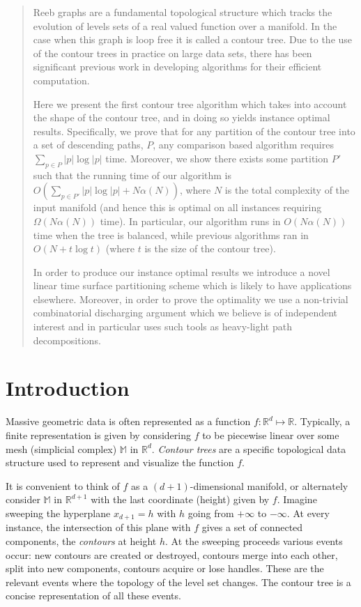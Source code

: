\documentclass[11pt]{article}
\theoremstyle{definition}
\newcommand{\MM}{\mathbb{M}}
\newcommand{\RR}{\mathbb{R}}
\begin{document}
\begin{abstract}
{Reeb graphs are a fundamental topological structure which tracks the evolution of levels sets of a real valued function over a manifold.  
In the case when this graph is loop free it is called a contour tree.  Due to the use of the contour trees in practice on large data sets, 
there has been significant previous work in developing algorithms for their efficient computation. 

Here we present the first contour tree algorithm which takes into account the shape of the contour tree, 
and in doing so yields instance optimal results.
Specifically, we prove that for any partition of the contour tree into a set of descending paths, $P$, 
any comparison based algorithm requires $\sum_{p\in P} |p|\log|p|$ time.  Moreover, we show there   
exists some partition $P'$ such that the running time of our algorithm is 
$O(\sum_{p\in P'} |p|\log|p| + N\alpha(N))$, where $N$ is the total complexity of the input manifold 
(and hence this is optimal on all instances requiring $\Omega(N\alpha(N))$ time).
In particular, our algorithm runs in $O(N\alpha(N))$ time when the tree is balanced, 
while previous algorithms ran in $O(N+t\log t)$ (where $t$ is the size of the contour tree).

In order to produce our instance optimal results we introduce a novel linear time surface partitioning scheme which is likely to have applications elsewhere.
Moreover, in order to prove the optimality we use a non-trivial combinatorial discharging argument which we believe is of independent interest and in particular uses 
such tools as heavy-light path decompositions.
}
\end{abstract}


\section{Introduction}

Massive geometric data is often represented as a function $f: \RR^d \mapsto \RR$. Typically, a finite representation is given
by considering $f$ to be piecewise linear over some mesh (simplicial complex) $\MM$ in $\RR^d$.
\emph{Contour trees} are a specific topological data structure used to represent and visualize
the function $f$.

It is convenient to think of $f$ as a $(d+1)$-dimensional manifold, or alternately consider
$\MM$ in $\RR^{d+1}$ with the last coordinate (height) given by $f$. Imagine sweeping the hyperplane $x_{d+1} = h$
with $h$ going from $+\infty$ to $-\infty$. At every instance, the intersection of this plane 
with $f$ gives a set of connected components, the \emph{contours} at height $h$. At the sweeping 
proceeds various events occur: new contours are created or destroyed, contours merge into each other,
split into new components, contours acquire or lose handles. These are the relevant events where 
the topology of the level set changes. The contour tree is a concise representation of all these events.
\end{document}

